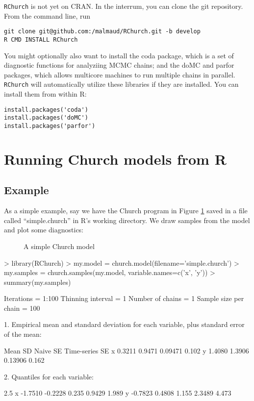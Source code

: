 \documentclass[12pt]{article}
\newcommand{\rchurch}{\texttt{RChurch}\xspace}
\newcommand{\church}{Church\xspace}
\newcommand{\R}{R\xspace}
\begin{document}
\rchurch is not yet on CRAN. In the interrum, you can clone the git repository. From the command line, run
\begin{verbatim}
git clone git@github.com:/malmaud/RChurch.git -b develop
R CMD INSTALL RChurch
\end{verbatim}

You might optionally also want to install the coda package, which is a set of diagnostic functions for analyziing MCMC chains; and the doMC and parfor packages, which allows multicore machines to run multiple chains in parallel. \rchurch will automatically utilize these libraries if they are installed. You can install them from within R:
\lstset{language=R}
\begin{lstlisting}
install.packages('coda')
install.packages('doMC')
install.packages('parfor')
\end{lstlisting}

\section{Running Church models from R}
\subsection{Example}
As a simple example, say we have the \church program in Figure \ref{fig:church1} saved in a file called ``simple.church'' in \R's working directory. We draw samples from the model and plot some diagnostics:
\begin{figure}
\lstset{language=lisp}

\caption{A simple Church model}
\label{fig:church1}

\end{figure}

\begin{Schunk}
\begin{Sinput}
> library(RChurch)
> my.model = church.model(filename='simple.church')
> my.samples = church.samples(my.model, variable.names=c('x', 'y'))
> summary(my.samples)
\end{Sinput}
\begin{Soutput}
Iterations = 1:100
Thinning interval = 1 
Number of chains = 1 
Sample size per chain = 100 

1. Empirical mean and standard deviation for each variable,
   plus standard error of the mean:

    Mean     SD Naive SE Time-series SE
x 0.3211 0.9471  0.09471          0.102
y 1.4080 1.3906  0.13906          0.162

2. Quantiles for each variable:

     2.5%     25%   50%    75% 97.5%
x -1.7510 -0.2228 0.235 0.9429 1.989
y -0.7823  0.4808 1.155 2.3489 4.473
\end{Soutput}
\end{Schunk}
\end{document}
